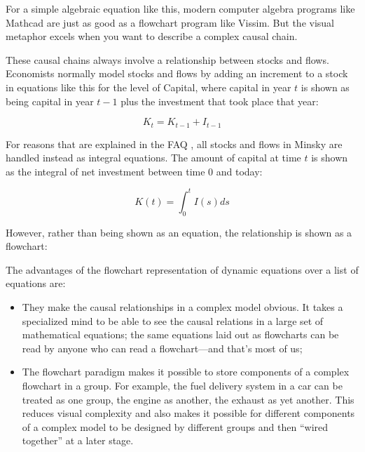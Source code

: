 For a simple algebraic equation like this, modern computer algebra
programs like Mathcad are just as good as a flowchart program like
Vissim. But the visual metaphor excels when you want to describe a
complex causal chain.


These causal chains always involve a relationship between stocks and
flows. Economists normally model stocks and flows by adding an
increment to a stock in equations like this for the level of Capital,
where capital in year $t$ is shown as being capital in year $t-1$ plus
the investment that took place that year:

\begin{displaymath}
K_t=K_{t-1}+I_{t-1}
\end{displaymath}

For reasons that are explained in the FAQ , all stocks and flows in Minsky are
handled instead as integral equations. The amount of capital at time
$t$ is shown as the integral of net investment between time 0 and
today:

\begin{displaymath}
K(t)=\int_0^t I(s)ds
\end{displaymath}

However, rather than being shown as an equation, the relationship is shown as a flowchart:

\begin{center}
\end{center}

The advantages of the flowchart representation of dynamic equations
over a list of equations are:
\begin{itemize}
\item    They make the causal relationships in a complex model
  obvious. It takes a specialized mind to be able to see the causal
  relations in a large set of mathematical equations; the same
  equations laid out as flowcharts can be read by anyone who can read
  a flowchart---and that's most of us;
\item The flowchart paradigm makes it possible to store components of
  a complex flowchart in a group. For example, the fuel delivery
  system in a car can be treated as one group, the engine as another,
  the exhaust as yet another. This reduces visual complexity and also
  makes it possible for different components of a complex model to be
  designed by different groups and then ``wired together'' at a later
  stage.
\end{itemize}

